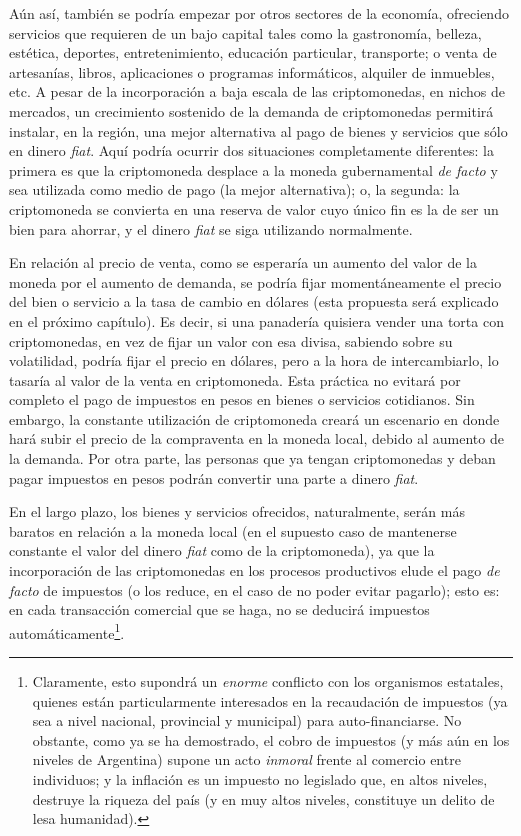 \documentclass[12pt,a4paper,twoside]{book}
\begin{document}
Aún así, también se podría empezar por otros sectores de la economía, ofreciendo servicios que requieren de un bajo capital tales como la gastronomía, belleza, estética, deportes, entretenimiento, educación particular, transporte; o venta de artesanías, libros, aplicaciones o programas informáticos, alquiler de inmuebles, etc. A pesar de la incorporación a baja escala de las criptomonedas, en nichos de mercados, un crecimiento sostenido de la demanda de criptomonedas permitirá instalar, en la región, una mejor alternativa al pago de bienes y servicios que sólo en dinero \textit{fiat}. Aquí podría ocurrir dos situaciones completamente diferentes: la primera es que la criptomoneda desplace a la moneda gubernamental \textit{de facto} y sea utilizada como medio de pago (la mejor alternativa); o, la segunda: la criptomoneda se convierta en una reserva de valor cuyo único fin es la de ser un bien para ahorrar, y el dinero \textit{fiat} se siga utilizando normalmente.

En relación al precio de venta, como se esperaría un aumento del valor de la moneda por el aumento de demanda, se podría fijar momentáneamente el precio del bien o servicio a la tasa de cambio en dólares (esta propuesta será explicado en el próximo capítulo). Es decir, si una panadería quisiera vender una torta con criptomonedas, en vez de fijar un valor con esa divisa, sabiendo sobre su volatilidad, podría fijar el precio en dólares, pero a la hora de intercambiarlo, lo tasaría al valor de la venta en criptomoneda. Esta práctica no evitará por completo el pago de impuestos en pesos en bienes o servicios cotidianos. Sin embargo, la constante utilización de criptomoneda creará un escenario en donde hará subir el precio de la compraventa en la moneda local, debido al aumento de la demanda. Por otra parte, las personas que ya tengan criptomonedas y deban pagar impuestos en pesos podrán convertir una parte a dinero \textit{fiat}.

En el largo plazo, los bienes y servicios ofrecidos, naturalmente, serán más baratos en relación a la moneda local (en el supuesto caso de mantenerse constante el valor del dinero \textit{fiat} como de la criptomoneda), ya que la incorporación de las criptomonedas en los procesos productivos elude el pago \textit{de facto} de impuestos (o los reduce, en el caso de no poder evitar pagarlo); esto es: en cada transacción comercial que se haga, no se deducirá impuestos automáticamente\footnote{Claramente, esto supondrá un \textit{enorme} conflicto con los organismos estatales, quienes están particularmente interesados en la recaudación de impuestos (ya sea a nivel nacional, provincial y municipal) para auto-financiarse. No obstante, como ya se ha demostrado, el cobro de impuestos (y más aún en los niveles de Argentina) supone un acto \textit{inmoral} frente al comercio entre individuos; y la inflación es un impuesto no legislado que, en altos niveles, destruye la riqueza del país (y en muy altos niveles, constituye un delito de lesa humanidad).}.
\end{document}
